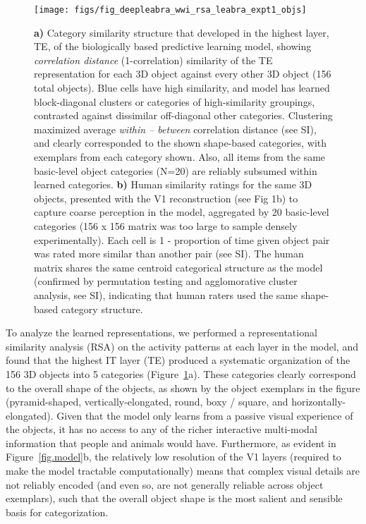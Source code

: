 \documentclass[11pt,twoside]{article}
\newif\myifpdf
\begin{document}
\begin{figure}
  \centering\texttt{[image: figs/fig\_deepleabra\_wwi\_rsa\_leabra\_expt1\_objs]}
  \caption{{\bf a)} Category similarity structure that developed in the highest layer, TE, of the biologically based predictive learning model, showing \emph{correlation distance} (1-correlation) similarity of the TE representation for each 3D object against every other 3D object (156 total objects).  Blue cells have high similarity, and model has learned block-diagonal clusters or categories of high-similarity groupings, contrasted against dissimilar off-diagonal other categories.  Clustering maximized average \emph{within -- between} correlation distance (see SI), and clearly corresponded to the shown shape-based categories, with exemplars from each category shown.  Also, all items from the same basic-level object categories (N=20) are reliably subsumed within learned categories. {\bf b)} Human similarity ratings for the same 3D objects, presented with the V1 reconstruction (see Fig 1b) to capture coarse perception in the model, aggregated by 20 basic-level categories (156 x 156 matrix was too large to sample densely experimentally).  Each cell is 1 - proportion of time given object pair was rated more similar than another pair (see SI).  The human matrix shares the same centroid categorical structure as the model (confirmed by permutation testing and agglomorative cluster analysis, see SI), indicating that human raters used the same shape-based category structure.}
  \label{fig.rsa}
\end{figure}

To analyze the learned representations, we performed a representational similarity analysis (RSA) on the activity patterns at each layer in the model, and found that the highest IT layer (TE) produced a systematic organization of the 156 3D objects into 5 categories (Figure~\ref{fig.rsa}a).  These categories clearly correspond to the overall shape of the objects, as shown by the object exemplars in the figure (pyramid-shaped, vertically-elongated, round, boxy / square, and horizontally-elongated).  Given that the model only learns from a passive visual experience of the objects, it has no access to any of the richer interactive multi-modal information that people and animals would have.  Furthermore, as evident in Figure~\ref{fig.model}b, the relatively low resolution of the V1 layers (required to make the model tractable computationally) means that complex visual details are not reliably encoded (and even so, are not generally reliable across object exemplars), such that the overall object shape is the most salient and sensible basis for categorization.
\end{document}
